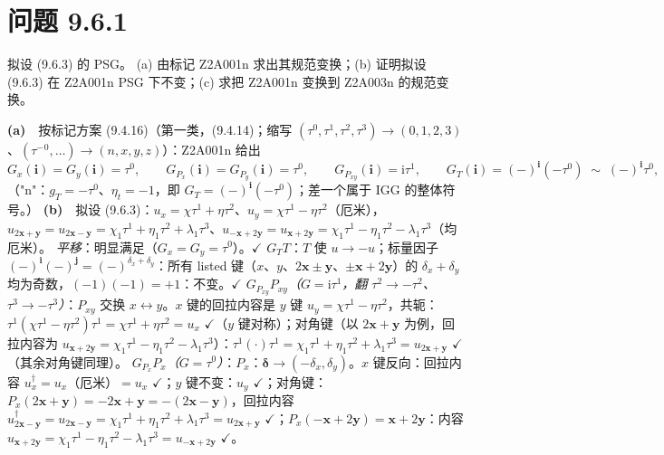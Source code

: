 \section*{问题 9.6.1}
\begin{problem}
拟设 (9.6.3) 的 PSG。
(a) 由标记 Z2A001n 求出其规范变换；(b) 证明拟设 (9.6.3) 在 Z2A001n PSG 下不变；(c) 求把 Z2A001n 变换到 Z2A003n 的规范变换。
\end{problem}
\solution
\textbf{(a)}　按标记方案 (9.4.16)（第一类，(9.4.14)；缩写 $(\tau^0,\tau^1,\tau^2,\tau^3)\to(0,1,2,3)$、$(\tau^-{}^0,\dots)\to(n,x,y,z)$）：Z2A001n 给出
\begin{equation*}
G_x(\pmb{i})=G_y(\pmb{i})=\tau^0,\qquad
G_{P_x}(\pmb{i})=G_{P_y}(\pmb{i})=\tau^0,\qquad
G_{P_{xy}}(\pmb{i})=\mathrm{i}\tau^1,\qquad
G_T(\pmb{i})=(-)^{\pmb{i}}(-\tau^0)\;\sim\;(-)^{\pmb{i}}\tau^0 ,
\end{equation*}
（"n"：$g_T=-\tau^0$、$\eta_t=-1$，即 $G_T=(-)^{\pmb{i}}(-\tau^0)$；差一个属于 IGG 的整体符号。）
\textbf{(b)}　拟设 (9.6.3)：$u_x=\chi\tau^1+\eta\tau^2$、$u_y=\chi\tau^1-\eta\tau^2$（厄米），$u_{2\pmb{x}+\pmb{y}}=u_{2\pmb{x}-\pmb{y}}=\chi_1\tau^1+\eta_1\tau^2+\lambda_1\tau^3$、$u_{-\pmb{x}+2\pmb{y}}=u_{\pmb{x}+2\pmb{y}}=\chi_1\tau^1-\eta_1\tau^2-\lambda_1\tau^3$（均厄米）。
\emph{平移}：明显满足（$G_x=G_y=\tau^0$）。$\checkmark$
\emph{$G_TT$}：$T$ 使 $u\to-u$；标量因子 $(-)^{\pmb{i}}(-)^{\pmb{j}}=(-)^{\delta_x+\delta_y}$：所有 listed 键（$x$、$y$、$2\pmb{x}\pm\pmb{y}$、$\pm\pmb{x}+2\pmb{y}$）的 $\delta_x+\delta_y$ 均为奇数，$(-1)(-1)=+1$：不变。$\checkmark$
\emph{$G_{P_{xy}}P_{xy}$（$G=\mathrm{i}\tau^1$，翻 $\tau^{2}\to-\tau^{2}$、$\tau^{3}\to-\tau^{3}$）}：$P_{xy}$ 交换 $x\leftrightarrow y$。$x$ 键的回拉内容是 $y$ 键 $u_y=\chi\tau^1-\eta\tau^2$，共轭：$\tau^1(\chi\tau^1-\eta\tau^2)\tau^1=\chi\tau^1+\eta\tau^2=u_x$ $\checkmark$（$y$ 键对称）；对角键（以 $2\pmb{x}+\pmb{y}$ 为例，回拉内容为 $u_{\pmb{x}+2\pmb{y}}=\chi_1\tau^1-\eta_1\tau^2-\lambda_1\tau^3$）：$\tau^1(\cdot)\tau^1=\chi_1\tau^1+\eta_1\tau^2+\lambda_1\tau^3=u_{2\pmb{x}+\pmb{y}}$ $\checkmark$（其余对角键同理）。
\emph{$G_{P_x}P_x$（$G=\tau^0$）}：$P_x$：$\pmb{\delta}\to(-\delta_x,\delta_y)$。$x$ 键反向：回拉内容 $u_x^{\dagger}=u_x$（厄米）$=u_x$ $\checkmark$；$y$ 键不变：$u_y$ $\checkmark$；对角键：$P_x(2\pmb{x}+\pmb{y})=-2\pmb{x}+\pmb{y}=-\!(2\pmb{x}-\pmb{y})$，回拉内容 $u^{\dagger}_{2\pmb{x}-\pmb{y}}=u_{2\pmb{x}-\pmb{y}}=\chi_1\tau^1+\eta_1\tau^2+\lambda_1\tau^3=u_{2\pmb{x}+\pmb{y}}$ $\checkmark$；$P_x(-\pmb{x}+2\pmb{y})=\pmb{x}+2\pmb{y}$：内容 $u_{\pmb{x}+2\pmb{y}}=\chi_1\tau^1-\eta_1\tau^2-\lambda_1\tau^3=u_{-\pmb{x}+2\pmb{y}}$ $\checkmark$。
